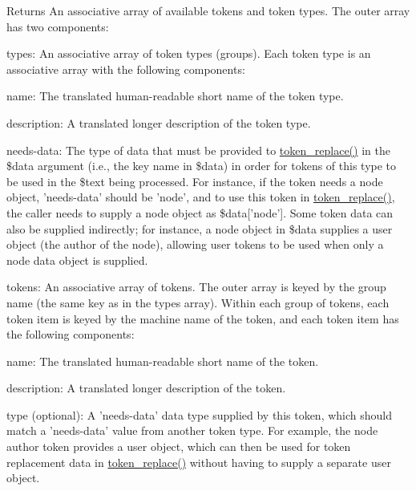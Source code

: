 \begin{DoxyReturn}{Returns}
An associative array of available tokens and token types. The outer array has two components:
\begin{DoxyItemize}
\item types: An associative array of token types (groups). Each token type is an associative array with the following components:
\begin{DoxyItemize}
\item name: The translated human-\/readable short name of the token type.
\item description: A translated longer description of the token type.
\item needs-\/data: The type of data that must be provided to \hyperlink{includes_2token_8inc_a47eb294b05ca8d04439a9a82ccc4d82a}{token\_\-replace()} in the \$data argument (i.e., the key name in \$data) in order for tokens of this type to be used in the \$text being processed. For instance, if the token needs a node object, 'needs-\/data' should be 'node', and to use this token in \hyperlink{includes_2token_8inc_a47eb294b05ca8d04439a9a82ccc4d82a}{token\_\-replace()}, the caller needs to supply a node object as \$data\mbox{[}'node'\mbox{]}. Some token data can also be supplied indirectly; for instance, a node object in \$data supplies a user object (the author of the node), allowing user tokens to be used when only a node data object is supplied.
\end{DoxyItemize}
\item tokens: An associative array of tokens. The outer array is keyed by the group name (the same key as in the types array). Within each group of tokens, each token item is keyed by the machine name of the token, and each token item has the following components:
\begin{DoxyItemize}
\item name: The translated human-\/readable short name of the token.
\item description: A translated longer description of the token.
\item type (optional): A 'needs-\/data' data type supplied by this token, which should match a 'needs-\/data' value from another token type. For example, the node author token provides a user object, which can then be used for token replacement data in \hyperlink{includes_2token_8inc_a47eb294b05ca8d04439a9a82ccc4d82a}{token\_\-replace()} without having to supply a separate user object.
\end{DoxyItemize}
\end{DoxyItemize}
\end{DoxyReturn}
